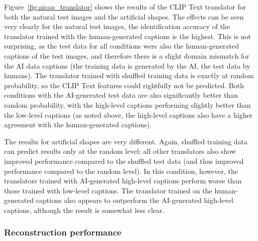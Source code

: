 Figure~\ref{fig:aicap_translator} shows the results of the CLIP Text translator for both the natural test images and the artificial shapes. The effects can be seen very clearly for the natural test images, the identification accuracy of the translator trained with the human-generated captions is the highest. This is not surprising, as the test data for all conditions were also the human-generated captions of the test images, and therefore there is a slight domain mismatch for the AI data captions (the training data is generated by the AI, the test data by humans). The translator trained with shuffled training data is exactly at random probability, so the CLIP Text features could rightfully not be predicted. Both conditions with the AI-generated test data are also significantly better than random probability, with the high-level captions performing slightly better than the low-level captions (as noted above, the high-level captions also have a higher agreement with the human-generated captions). 


The results for artificial shapes are very different. Again, shuffled training data can predict results only at the random level; all other translators also show improved performance compared to the shuffled test data (and thus improved performance compared to the random level). In this condition, however, the translators trained with AI-generated high-level captions perform worse than those trained with low-level captions. The translator trained on the human-generated captions also appears to outperform the AI-generated high-level captions, although the result is somewhat less clear. 

\subsubsection{Reconstruction performance}


